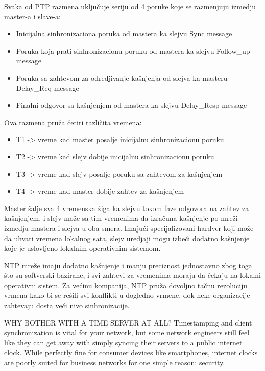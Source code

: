 \documentclass[a4paper,12pt, master]{etf}
\begin{document}
	Svaka od PTP razmena uklju\v{c}uje seriju od 4 poruke koje se razmenjuju izmedju master-a i 
	slave-a:
	\begin{itemize}
		\item Inicijalna sinhronizaciona poruka od mastera ka slejvu {Sync message}
		\item Poruka koja prati sinhronizacionu poruku od mastera ka slejvu {Follow\_up message}
		\item Poruka sa zahtevom za odredjivanje ka\v{s}njenja od slejva ka masteru {Delay\_Req 
		message}
		\item Finalni odgovor sa ka\v{s}njenjem od mastera ka slejvu {Delay\_Resp message}
    \end{itemize}
    
	Ova razmena pru\v{z}a \v{c}etiri razli\v{c}ita vremena:
	\begin{itemize}
		\item T1 -> vreme kad master posalje inicijalnu sinhronizacionu poruku
		\item T2 -> vreme kad slejv dobije inicijalnu sinhronizacionu poruku
		\item T3 -> vreme kad slejv posalje poruku sa zahtevom za ka\v{s}njenjem
		\item T4 -> vreme kad master dobije zahtev za ka\v{s}njenjem
    \end{itemize}
    
	Master \v{s}alje sva 4 vremenska \v{z}iga ka slejvu tokom faze odgovora na zahtev za ka\v{s}njenjem, 
	i slejv mo\v{z}e sa tim vremenima da izra\v{c}una ka\v{s}njenje po mre\v{z}i izmedju mastera i slejva u 
	oba smera. Imaju\'{c}i specijalizovani hardver koji mo\v{z}e da uhvati vremena lokalnog sata, 
	slejv uredjaji mogu izbe\'{c}i dodatno ka\v{s}njenje koje je uslovljeno lokalnim operativnim 
	sistemom.

	NTP mre\v{z}e imaju dodatno ka\v{s}njenje i manju preciznost jednostavno zbog toga \v{s}to su 
	softverski bazirane, i svi zahtevi za vremenima moraju da \v{c}ekaju na lokalni operativni 
	sistem. Za ve\'{c}inu kompanija, NTP pru\v{z}a dovoljno ta\v{c}nu rezoluciju vrmena kako bi se re\v{s}ili 
	svi konflikti u dogledno vrmene, dok neke organizacije zahtevaju dosta ve\'{c}i nivo 
	sinhronizacije.

	WHY BOTHER WITH A TIME SERVER AT ALL?
	Timestamping and client synchronization is vital for your network, but some network 
	engineers still feel like they can get away with simply syncing their servers to a public 
	internet clock. While perfectly fine for consumer devices like smartphones, internet 
	clocks are poorly suited for business networks for one simple reason: security.
\end{document}
